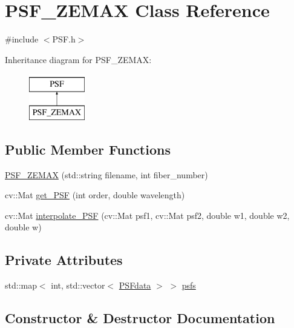 \hypertarget{class_p_s_f___z_e_m_a_x}{}\section{P\+S\+F\+\_\+\+Z\+E\+M\+AX Class Reference}
\label{class_p_s_f___z_e_m_a_x}


{\ttfamily \#include $<$P\+S\+F.\+h$>$}

Inheritance diagram for P\+S\+F\+\_\+\+Z\+E\+M\+AX\+:\begin{figure}[H]
\begin{center}
\leavevmode
\includegraphics[height=2.000000cm]{class_p_s_f___z_e_m_a_x}
\end{center}
\end{figure}
\subsection*{Public Member Functions}
\begin{DoxyCompactItemize}
\item 
\hyperlink{class_p_s_f___z_e_m_a_x_aa1d613e53e5acb9744461efd35c2ef09}{P\+S\+F\+\_\+\+Z\+E\+M\+AX} (std\+::string filename, int fiber\+\_\+number)
\item 
cv\+::\+Mat \hyperlink{class_p_s_f___z_e_m_a_x_a2fec338597b88e4f560489e9648649c5}{get\+\_\+\+P\+SF} (int order, double wavelength)
\item 
cv\+::\+Mat \hyperlink{class_p_s_f___z_e_m_a_x_ad3b5bb955539e861246cc0f3e3add141}{interpolate\+\_\+\+P\+SF} (cv\+::\+Mat psf1, cv\+::\+Mat psf2, double w1, double w2, double w)
\end{DoxyCompactItemize}
\subsection*{Private Attributes}
\begin{DoxyCompactItemize}
\item 
std\+::map$<$ int, std\+::vector$<$ \hyperlink{struct_p_s_fdata}{P\+S\+Fdata} $>$ $>$ \hyperlink{class_p_s_f___z_e_m_a_x_af44c6c61ee1c43bfb34b98922f796bad}{psfs}
\end{DoxyCompactItemize}


\subsection{Constructor \& Destructor Documentation}
